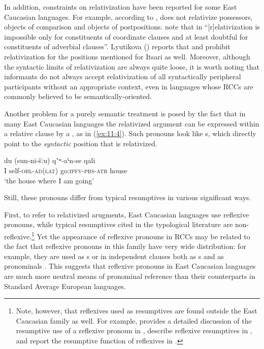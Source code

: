 ﻿\documentclass[output=paper]{langsci/langscibook}
\begin{document}
In addition, constraints on relativization have been reported for some
East Caucasian languages. For example, according to \citet[215]{tatevosov1996},  does not relativize possessors, objects of comparison and
objects of postpositions. \citet{mutalov-sumbatova2003} note that in
 ``[r]elativization is impossible only for constituents
of coordinate clauses and at least doubtful for constituents of
adverbial clauses''. Lyutikova (\citeyear{lyutikova1999, lyutikova2001}) reports that  and
 prohibit relativization for the positions mentioned for Itsari
as well. Moreover, although the syntactic limits of relativization are
always quite loose, it is worth noting that informants do not always
accept relativization of all syntactically peripheral participants
without an appropriate context, even in languages whose RCCs are
commonly believed to be semantically-oriented.

Another problem for a purely semantic treatment is posed by the fact
that in many East Caucasian languages the relativized argument can be
expressed within a relative clause by a , as in (\ref{ex:11:4}).
Such pronouns look like s, which directly point to the
\emph{syntactic} position that is relativized.

\ea \label{ex:11:4} %
\gll  du \textup(sun-ni-šːu\textup) qʼʷ-aˤn-se qali\\
I self-\textsc{obl}-\textsc{ad}(\textsc{lat}) go:\textsc{ipfv}-\textsc{prs}-\textsc{atr} house\\
\glt  `the house where I am going'
\z

Still, these pronouns differ from typical resumptives in various
significant ways.

First, to refer to relativized arugments, East Caucasian languages use
reflexive pronouns, while typical resumptives cited in the typological
literature are non-reflexive.\footnote{Note, however, that reflexives
  used as resumptives are found outside the East Caucasian family as
  well. For example, \citet{lee2004} provides a detailed discussion of the
  resumptive use of a reflexive pronoun in , \citet{csató-uchturpani2010}
  describe reflexive resumptives in , and \citet[219]{johanson-csató1998}
  report the resumptive function of reflexives in .}
Yet the appearance of reflexive pronouns in RCCs may be related to the
fact that reflexive pronouns in this family have very wide distribution:
for example, they are used as s or in independent
clauses both as s and as pronominals \citep{testelets-toldova1998}.
This suggests that reflexive pronouns in East Caucasian languages
are much more neutral means of pronominal reference than their
counterparts in Standard Average European languages.
\end{document}
